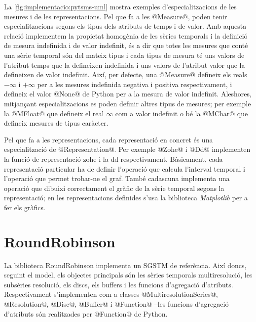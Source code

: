 La \autoref{fig:implementacio:pytsms-uml} mostra exemples
d'especialitzacions de les mesures i de les representacions.
%
Pel que fa a les @Measure@, poden tenir especialitzacions segons
els tipus dels atributs de temps i de valor. Amb aquesta relació
implementem la propietat homogènia de les sèries temporals i la
definició de mesura indefinida i de valor indefinit, és a dir que
totes les mesures que conté una sèrie temporal són del mateix tipus i
cada tipus de mesura té uns valors de l'atribut temps que la
defineixen indefinida i uns valors de l'atribut valor que la
defineixen de valor indefinit.  Així, per defecte, una @Measure@
defineix els reals $-\infty$ i $+\infty$ per a les mesures indefinida
negativa i positiva respectivament, i defineix el valor @None@ de
Python per a la mesura de valor indefinit. Aleshores, mitjançant
especialitzacions es poden definir altres tipus de mesures; per
exemple la @MFloat@ que defineix el real $\infty$ com a valor
indefinit o bé la @MChar@ que defineix mesures de tipus caràcter.




Pel que fa a les representacions, cada representació en concret és una
especialització de @Representation@. Per exemple @Zohe@ i
@Dd@ implementen la funció de representació \gls{zohe} i la \gls{dd}
respectivament.
Bàsicament, cada representació particular ha de definir l'operació que
calcula l'interval temporal i l'operació que permet trobar-ne el graf.
També cadascuna implementa una operació que dibuixi correctament el
gràfic de la sèrie temporal segons la representació; en les
representacions definides s'usa la biblioteca
\emph{Matplotlib} \parencite{python:matplotlib}  per a fer els gràfics.







\section{RoundRobinson}

La biblioteca RoundRobinson implementa un \gls{SGSTM} de
referència. Així doncs, seguint el model, els objectes principals són
les sèries temporals multiresolució, les subsèries resolució, els
discs, els buffers i les funcions d'agregació
d'atributs. Respectivament s'implementen com a classes
@MultiresolutionSeries@, @Resolution@, @Disc@, @Buffer@ i @Function@
--les funcions d'agregació d'atributs són realitzades per @Function@
de Python.


